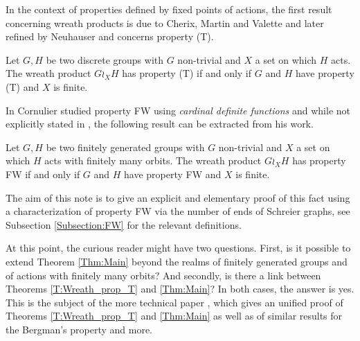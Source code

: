 In the context of properties defined by fixed points of actions, the first result concerning wreath products is due to Cherix, Martin and Valette and later refined by Neuhauser and concerns property (T).
%
%
\begin{thm} \label{T:Wreath_prop_T}
Let $G,H$ be two discrete groups with $G$ non-trivial and $X$ a set on which $H$ acts. The wreath product $G \wr_X H$ has property (T) if and only if $G$ and $H$ have property (T) and $X$ is finite.
\end{thm}
%
%
In \cite{Cornulier2013} Cornulier studied property FW using \emph{cardinal definite functions} and while not explicitly stated in \cite{Cornulier2013}, the following result can be extracted from his work.
%
%
\begin{thm}\label{Thm:Main}
Let $G,H$ be two finitely generated groups with $G$ non-trivial and $X$ a set on which $H$ acts with finitely many orbits. The wreath product $G \wr_X H$ has property FW if and only if $G$ and $H$ have property FW and $X$ is finite.
\end{thm}
%
%
The aim of this note is to give an explicit and elementary proof of this fact using a characterization of property FW via the number of ends of Schreier graphs, see Subsection \ref{Subsection:FW} for the relevant definitions. 


At this point, the curious reader might have two questions. First, is it possible to extend Theorem \ref{Thm:Main} beyond the realms of finitely generated groups and of actions with finitely many orbits? And secondly, is there a link between Theorems \ref{T:Wreath_prop_T} and \ref{Thm:Main}?
In both cases, the answer is yes.
This is the subject of the more technical paper \cite{LS2021}, which gives an unified proof of Theorems \ref{T:Wreath_prop_T} and \ref{Thm:Main} as well as of similar results for the Bergman's property and more.
%
%
%
%
